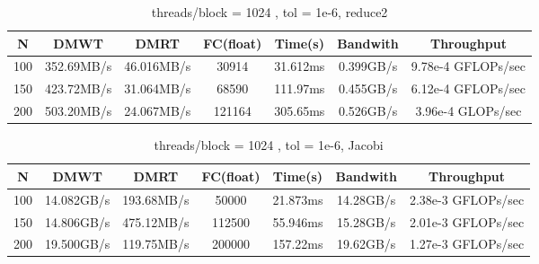 \documentclass{amsart} %
\begin{document}
\begin{table}[ht]
	\caption{threads/block = 1024 , tol = 1e-6, reduce2} %
	\centering %
	\begin{tabular}{c c c c c c c} %
		\hline\hline %
		N & DMWT & DMRT & FC(float) &Time(s) & Bandwith & Throughput\\ [0.5ex] %
		\hline %
		100 & 352.69MB/s & 46.016MB/s & 30914 & 31.612ms & 0.399GB/s & 9.78e-4 GFLOPs/sec\\ %
		150 & 423.72MB/s & 31.064MB/s & 68590 & 111.97ms & 0.455GB/s & 6.12e-4 GFLOPs/sec\\
		200 & 503.20MB/s & 24.067MB/s & 121164 &305.65ms & 0.526GB/s & 3.96e-4 GLOPs/sec\\[1ex] %
		\hline %
	\end{tabular}
	\label{table:nonlin} %
\end{table}
\FloatBarrier

\begin{table}[ht]
	\caption{threads/block = 1024 , tol = 1e-6, Jacobi} %
	\centering %
	\begin{tabular}{c c c c c c c} %
		\hline\hline %
		N & DMWT & DMRT & FC(float) &Time(s) & Bandwith & Throughput\\ [0.5ex] %
		\hline %
		100 & 14.082GB/s & 193.68MB/s & 50000 & 21.873ms & 14.28GB/s & 2.38e-3 GFLOPs/sec\\ %
		150 & 14.806GB/s & 475.12MB/s & 112500 &55.946ms & 15.28GB/s & 2.01e-3 GFLOPs/sec\\
		200 & 19.500GB/s & 119.75MB/s & 200000 &157.22ms & 19.62GB/s & 1.27e-3 GFLOPs/sec\\[1ex] %
		\hline %
	\end{tabular}
	\label{table:nonlin} %
\end{table}
\FloatBarrier
\end{document}
